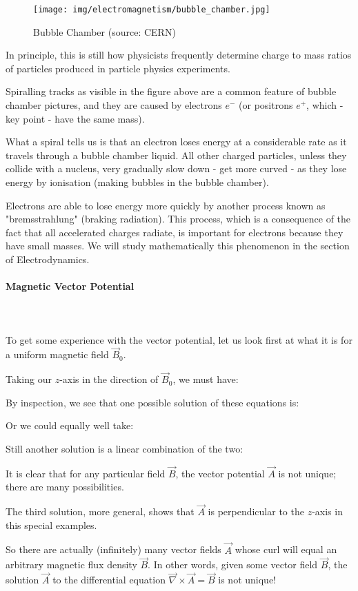 	\begin{figure}[H]
		\centering
		\texttt{[image: img/electromagnetism/bubble\_chamber.jpg]}
		\caption{Bubble Chamber (source: CERN)}
	\end{figure}
	In principle, this is still how physicists frequently determine charge to mass ratios of particles produced in particle physics experiments.
	
	Spiralling tracks as visible in the figure above are a common feature of bubble chamber pictures, and they are caused by electrons $e^{-}$ (or positrons  $e^{+}$, which - key point - have the same mass).

	What a spiral tells us is that an electron loses energy at a considerable rate as it travels through a bubble chamber liquid. All other charged particles, unless they collide with a nucleus, very gradually slow down - get more curved - as they lose energy by ionisation (making bubbles in the bubble
chamber).

	Electrons are able to lose energy more quickly by another process known as "bremsstrahlung" (braking radiation). This process, which is a consequence of the fact that all accelerated charges radiate, is important for electrons because they have small masses. We will study mathematically this phenomenon in the section of Electrodynamics.
	
	\paragraph{Magnetic Vector Potential}\mbox{}\\\\
	To get some experience with the vector potential, let us look first at what it is for a uniform magnetic field $\vec{B}_0$. 

	Taking our $z$-axis in the direction of $\vec{B}_0$, we must have:
	
	By inspection, we see that one possible solution of these equations is:
	
	Or we could equally well take:
	
	Still another solution is a linear combination of the two:
	
	It is clear that for any particular field $\vec{B}$, the vector potential $\vec{A}$ is not unique; there are many possibilities.
	
	The third solution, more general, shows that $\vec{A}$ is perpendicular to the $z$-axis in this special examples. 
	
	So there are actually (infinitely) many vector fields $\vec{A}$ whose curl will equal an arbitrary magnetic flux density $\vec{B}$. In other words, given some vector field $\vec{B}$, the solution $\vec{A}$ to the differential equation $\vec{\nabla}\times\vec{A}=\vec{B}$ is not unique!

